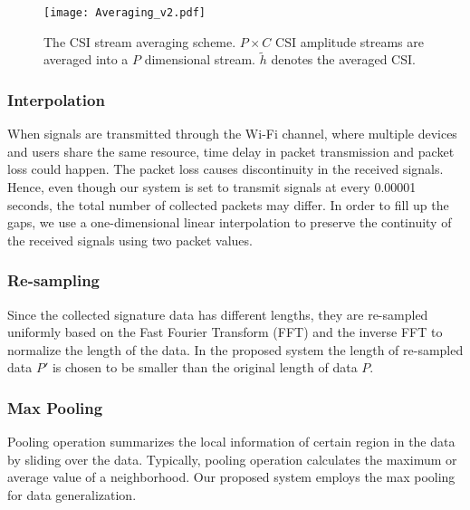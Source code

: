 

\begin{figure}[!ht]
	\begin{center}
		\texttt{[image: Averaging\_v2.pdf]}
	\end{center}
	\caption{The CSI stream averaging scheme. $P\times C$ CSI amplitude streams are averaged into a $P$ dimensional stream. $\tilde{h}$ denotes the averaged CSI.} 
	\label{fig:Averaging}
\end{figure}

\subsubsection{Interpolation}
\label{sec:Interpolation}
When signals are transmitted through the Wi-Fi channel, where multiple devices and users share the same resource, time delay in packet transmission and packet loss could happen. The packet loss causes discontinuity in the received signals. Hence, even though our system is set to transmit signals at every 0.00001 seconds, the total number of collected packets may differ. In order to fill up the gaps, we use a one-dimensional linear interpolation to preserve the continuity of the received signals using two packet values.

\subsubsection{Re-sampling}
\label{sec:resampling}
Since the collected signature data has different lengths, they are re-sampled uniformly based on the Fast Fourier Transform (FFT) and the inverse FFT \cite{Python:Resampling} to normalize the length of the data. In the proposed system the length of re-sampled data $P'$ is chosen to be smaller than the original length of data $P$.

\subsubsection{Max Pooling}
Pooling operation summarizes the local information of certain region in the data by sliding over the data. Typically, pooling operation calculates the maximum or average value of a neighborhood. Our proposed system employs the max pooling for data generalization. 


